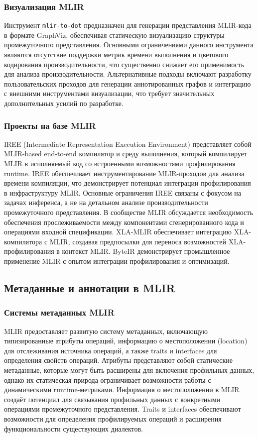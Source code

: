 \subsubsection{Визуализация MLIR}
Инструмент \texttt{mlir-to-dot} предназначен для генерации представления MLIR-кода в формате GraphViz, обеспечивая статическую визуализацию структуры промежуточного представления. Основными ограничениями данного инструмента являются отсутствие поддержки метрик времени выполнения и цветового кодирования производительности, что существенно снижает его применимость для анализа производительности.
Альтернативные подходы включают разработку пользовательских проходов для генерации аннотированных графов и интеграцию с внешними инструментами визуализации, что требует значительных дополнительных усилий по разработке.

\subsubsection{Проекты на базе MLIR}
IREE (Intermediate Representation Execution Environment) \cite{iree_main} \cite{iree_tracy} представляет собой MLIR-based end-to-end компилятор и среду выполнения, который компилирует MLIR в исполняемый код со встроенными возможностями профилирования runtime.
IREE обеспечивает инструментирование MLIR-проходов для анализа времени компиляции, что демонстрирует потенциал интеграции профилирования в инфраструктуру MLIR.
Основные ограничения IREE связаны с фокусом на задачах инференса, а не на детальном анализе производительности промежуточного представления.
В сообществе MLIR обсуждается необходимость обеспечения прослеживаемости между компонентами сгенерированного кода и операциями входной спецификации.
XLA-MLIR обеспечивает интеграцию XLA-компилятора \cite{xla_main} с MLIR, создавая предпосылки для переноса возможностей XLA-профилирования в контекст MLIR. ByteIR демонстрирует промышленное применение MLIR с опытом интеграции профилирования и оптимизаций.

\subsection{Метаданные и аннотации в MLIR}

\subsubsection{Системы метаданных MLIR}
MLIR предоставляет развитую систему метаданных, включающую типизированные атрибуты операций, информацию о местоположении (location) для отслеживания источника операций, а также traits и interfaces для определения свойств операций.
 Атрибуты представляют собой статические метаданные, которые могут быть расширены для включения профильных данных, однако их статическая природа ограничивает возможности работы с динамическими runtime-метриками.
Информация о местоположении в MLIR создаёт потенциал для связывания профильных данных с конкретными операциями промежуточного представления.
Traits и interfaces обеспечивают возможности для определения профилируемых операций и расширения функциональности существующих диалектов.

